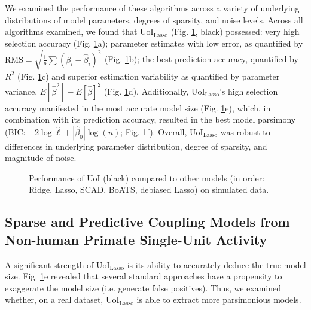 \documentclass[letterpaper, 10 pt, conference]{ieeeconf}  %
\begin{document}
We examined the performance of these algorithms across a variety of underlying distributions of model parameters, degrees of sparsity, and noise levels. Across all algorithms examined, we found that UoI$_{\text{Lasso}}$ (Fig. \ref{fig:simulated}, black) possessed: very high selection accuracy (Fig. \ref{fig:simulated}a); parameter estimates with low error, as quantified by $\text{RMS}=\sqrt{\frac{1}{p} \sum(\beta_i -\hat{\beta}_i)^2}$ (Fig. \ref{fig:simulated}b); the best prediction accuracy, quantified by $R^2$ (Fig. \ref{fig:simulated}c) and superior estimation variability as quantified by parameter variance, $E[\hat{\beta}^2] - E[\hat{\beta}]^2$ (Fig. \ref{fig:simulated}d). Additionally, UoI$_{\text{Lasso}}$'s high selection accuracy manifested in the most accurate model size (Fig. \ref{fig:simulated}e), which, in combination with its prediction accuracy, resulted in the best model parsimony (BIC: $-2\log \hat{\ell} + |\hat{\beta}_0| \log(n)$; Fig. \ref{fig:simulated}f). Overall, UoI$_{\text{Lasso}}$ was robust to differences in underlying parameter distribution, degree of sparsity, and magnitude of noise.
\begin{figure}[t]
    \centering
    \caption{Performance of UoI (black) compared to other models (in order: Ridge, Lasso, SCAD, BoATS, debiased Lasso) on simulated data.}
    \label{fig:simulated}
\end{figure}
\subsection{Sparse and Predictive Coupling Models from Non-human Primate Single-Unit Activity}
A significant strength of UoI$_{\text{Lasso}}$ is its ability to accurately deduce the true model size. Fig. \ref{fig:simulated}e revealed that several standard approaches have a propensity to exaggerate the model size (i.e. generate false positives). Thus, we examined whether, on a real dataset, UoI$_{\text{Lasso}}$ is able to extract more parsimonious models.
\end{document}

